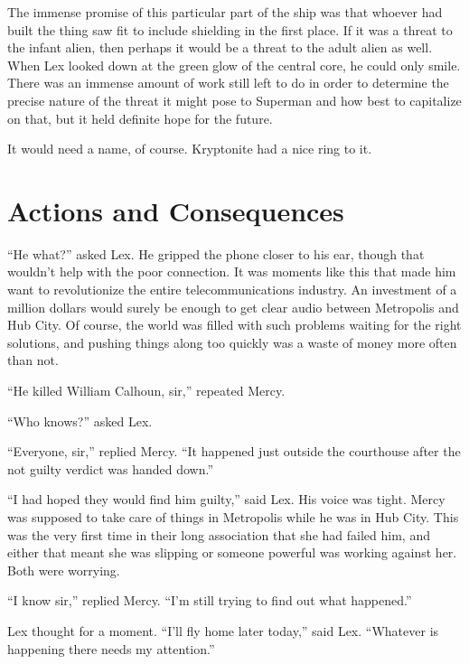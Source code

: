 \documentclass[ebook,12pt]{memoir}
\begin{document}
The immense promise of this particular part of the ship was that whoever
had built the thing saw fit to include shielding in the first place. If
it was a threat to the infant alien, then perhaps it would be a threat
to the adult alien as well. When Lex looked down at the green glow of
the central core, he could only smile. There was an immense amount of
work still left to do in order to determine the precise nature of the
threat it might pose to Superman and how best to capitalize on that, but
it held definite hope for the future.

It would need a name, of course. Kryptonite had a nice ring to it.



\hypertarget{actions-and-consequences}{%
\chapter{Actions and Consequences}\label{actions-and-consequences}}

``He what?'' asked Lex. He gripped the phone closer to his ear, though
that wouldn't help with the poor connection. It was moments like this
that made him want to revolutionize the entire telecommunications
industry. An investment of a million dollars would surely be enough to
get clear audio between Metropolis and Hub City. Of course, the world
was filled with such problems waiting for the right solutions, and
pushing things along too quickly was a waste of money more often than
not.

``He killed William Calhoun, sir,'' repeated Mercy.

``Who knows?'' asked Lex.

``Everyone, sir,'' replied Mercy. ``It happened just outside the
courthouse after the not guilty verdict was handed down.''

``I had hoped they would find him guilty,'' said Lex. His voice was
tight. Mercy was supposed to take care of things in Metropolis while he
was in Hub City. This was the very first time in their long association
that she had failed him, and either that meant she was slipping or
someone powerful was working against her. Both were worrying.

``I know sir,'' replied Mercy. ``I'm still trying to find out what
happened.''

Lex thought for a moment. ``I'll fly home later today,'' said Lex.
``Whatever is happening there needs my attention.''
\end{document}
